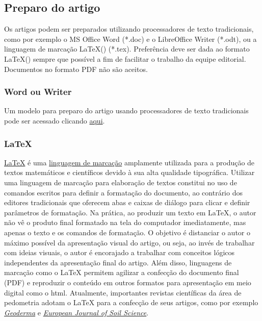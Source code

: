 \subsection{Preparo do artigo}

Os artigos podem ser preparados utilizando processadores de texto tradicionais, como por exemplo o MS Office Word (*.doc) e o LibreOffice Writer (*.odt), ou a linguagem de marcação \LaTeX() (*.tex). Preferência deve ser dada ao formato \LaTeX() sempre que possível a fim de facilitar o trabalho da equipe editorial. Documentos no formato PDF não são aceitos.

\subsubsection{Word ou Writer}

Um modelo para preparo do artigo usando processadores de texto tradicionais pode ser acessado clicando \href{https://docs.google.com/document/d/1pyK03RBDPhOMrTVfvj9NcEfjGWeswqYbYDqEKq83drQ/edit?usp=sharing}{aqui}.

\subsubsection{\LaTeX}

\href{http://pt.wikipedia.org/wiki/Latex}{\LaTeX} é uma \href{http://pt.wikipedia.org/wiki/Linguagem_de_marca\%C3\%A7\%C3\%A3o}{linguagem de marcação} amplamente utilizada para a produção de textos matemáticos e científicos devido à sua alta qualidade tipográfica. Utilizar uma linguagem de marcação para elaboração de textos constitui no uso de comandos escritos para definir a formatação do documento, ao contrário dos editores tradicionais que oferecem abas e caixas de diálogo para clicar e definir parâmetros de formatação. Na prática, ao produzir um texto em \LaTeX, o autor não vê o produto final formatado na tela do computador imediatamente, mas apenas o texto e os comandos de formatação. O objetivo é distanciar o autor o máximo possível da apresentação visual do artigo, ou seja, ao invés de trabalhar com ideias visuais, o autor é encorajado a trabalhar com conceitos lógicos independentes da apresentação final do artigo. Além disso, linguagens de marcação como o \LaTeX{} permitem agilizar a confecção do documento final (PDF) e reproduzir o conteúdo em outros formatos para apresentação em meio digital como o html. Atualmente, importantes revistas científicas da área de pedometria adotam o \LaTeX{} para a confecção de seus artigos, como por exemplo \href{http://www.elsevier.com/author-schemas/latex-instructions}{\textit{Geoderma}} e \href{http://onlinelibrary.wiley.com/journal/10.1111/\%28ISSN\%291365-2389/homepage/ForAuthors.html}{\textit{European Journal of Soil Science}}.

